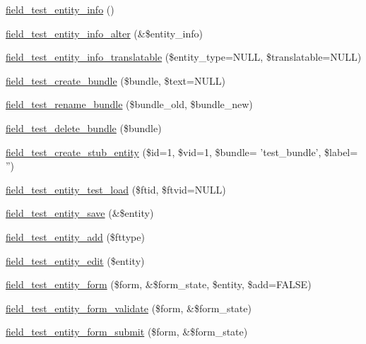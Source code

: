 \begin{DoxyCompactItemize}
\item 
\hyperlink{field__test_8entity_8inc_a51bbbb4d2a09faac17afe13915e29225}{field\_\-test\_\-entity\_\-info} ()
\item 
\hyperlink{field__test_8entity_8inc_a67703b2e4cd5f075eb297ffe91a23529}{field\_\-test\_\-entity\_\-info\_\-alter} (\&\$entity\_\-info)
\item 
\hyperlink{field__test_8entity_8inc_aa6b63bbc32987ee1c530fcdbfa61a193}{field\_\-test\_\-entity\_\-info\_\-translatable} (\$entity\_\-type=NULL, \$translatable=NULL)
\item 
\hyperlink{field__test_8entity_8inc_ab01b42bea066a819706c3034fffa5f7b}{field\_\-test\_\-create\_\-bundle} (\$bundle, \$text=NULL)
\item 
\hyperlink{field__test_8entity_8inc_a06a99d57d5a95dab9eb045b50aca418b}{field\_\-test\_\-rename\_\-bundle} (\$bundle\_\-old, \$bundle\_\-new)
\item 
\hyperlink{field__test_8entity_8inc_a1095cd674ad8f3ff03d9654f5d458209}{field\_\-test\_\-delete\_\-bundle} (\$bundle)
\item 
\hyperlink{field__test_8entity_8inc_af6eb00d8f9f9587e732a1be8b2b784c2}{field\_\-test\_\-create\_\-stub\_\-entity} (\$id=1, \$vid=1, \$bundle= 'test\_\-bundle', \$label= '')
\item 
\hyperlink{field__test_8entity_8inc_a5930250cf03c656cee13f8aaf849cf22}{field\_\-test\_\-entity\_\-test\_\-load} (\$ftid, \$ftvid=NULL)
\item 
\hyperlink{field__test_8entity_8inc_adb618b84348fcca91f26a3ba5900405a}{field\_\-test\_\-entity\_\-save} (\&\$entity)
\item 
\hyperlink{field__test_8entity_8inc_ab180fd4929a5b01119359b9dcf6da27e}{field\_\-test\_\-entity\_\-add} (\$fttype)
\item 
\hyperlink{field__test_8entity_8inc_acb9406030a9bf8851f1de5b8169996ca}{field\_\-test\_\-entity\_\-edit} (\$entity)
\item 
\hyperlink{field__test_8entity_8inc_a85a2c69ad395d255d448d7f3d72ba9f3}{field\_\-test\_\-entity\_\-form} (\$form, \&\$form\_\-state, \$entity, \$add=FALSE)
\item 
\hyperlink{field__test_8entity_8inc_a223ebb8c79571c498638f329fdefac54}{field\_\-test\_\-entity\_\-form\_\-validate} (\$form, \&\$form\_\-state)
\item 
\hyperlink{field__test_8entity_8inc_afd81eae9834f97ca915796f2e9240ef5}{field\_\-test\_\-entity\_\-form\_\-submit} (\$form, \&\$form\_\-state)

\end{DoxyCompactItemize}
